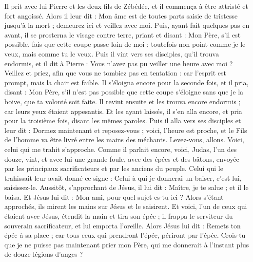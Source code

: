 \begin{multicols}{2}
Il prit avec lui Pierre et les deux fils de Zébédée, et il commença à être attristé et fort angoissé.
Alors il leur dit : Mon âme est de toutes parts saisie de tristesse jusqu'à la mort ; demeurez ici et veillez avec moi.
Puis, ayant fait quelques pas en avant, il se prosterna le visage contre terre, priant et disant : Mon Père, s'il est possible, fais que cette coupe passe loin de moi ; toutefois non point comme je le veux, mais comme tu le veux.
Puis il vint vers ses disciples, qu'il trouva endormis, et il dit à Pierre : Vous n'avez pas pu veiller une heure avec moi ?
Veillez et priez, afin que vous ne tombiez pas en tentation : car l'esprit est prompt, mais la chair est faible.
Il s'éloigna encore pour la seconde fois, et il pria, disant : Mon Père, s'il n'est pas possible que cette coupe s'éloigne sans que je la boive, que ta volonté soit faite.
Il revint ensuite et les trouva encore endormis ; car leurs yeux étaient appesantis.
Et les ayant laissés, il s'en alla encore, et pria pour la troisième fois, disant les mêmes paroles.
Puis il alla vers ses disciples et leur dit : Dormez maintenant et reposez-vous ; voici, l'heure est proche, et le Fils de l'homme va être livré entre les mains des méchants.
Levez-vous, allons. Voici, celui qui me trahit s'approche.
Comme il parlait encore, voici, Judas, l'un des douze, vint, et avec lui une grande foule, avec des épées et des bâtons, envoyée par les principaux sacrificateurs et par les anciens du peuple.
Celui qui le trahissait leur avait donné ce signe : Celui à qui je donnerai un baiser, c'est lui, saisissez-le.
Aussitôt, s'approchant de Jésus, il lui dit : Maître, je te salue ; et il le baisa.
Et Jésus lui dit : Mon ami, pour quel sujet es-tu ici ? Alors s'étant approchés, ils mirent les mains sur Jésus et le saisirent.
Et voici, l'un de ceux qui étaient avec Jésus, étendit la main et tira son épée ; il frappa le serviteur du souverain sacrificateur, et lui emporta l'oreille.
Alors Jésus lui dit : Remets ton épée à sa place ; car tous ceux qui prendront l'épée, périront par l'épée.
Crois-tu que je ne puisse pas maintenant prier mon Père, qui me donnerait à l'instant plus de douze légions d'anges ?

\end{multicols}
